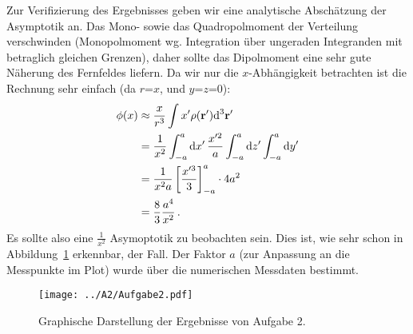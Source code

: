 Zur Verifizierung des Ergebnisses geben wir eine analytische Abschätzung der Asymptotik an. Das
Mono- sowie das Quadropolmoment der Verteilung verschwinden (Monopolmoment wg. Integration über ungeraden Integranden mit betraglich gleichen Grenzen), daher sollte das Dipolmoment eine sehr
gute Näherung des Fernfeldes liefern. Da wir nur die $x$-Abhängigkeit betrachten ist die Rechnung
sehr einfach (da $r$=$x$, und $y$=$z$=0):
\begin{equation}
	\begin{split}
		\phi (x) &\approx \frac{x}{r^3}\int x' \rho(\textbf{r}')\textup{d}^3\textbf{r}' \\
		&=\frac{1}{x^2} \int_{-a}^{a} \textup{d}x'\, \frac{x'^2}{a} \int_{-a}^{a} \textup{d}z' \int_{-a}^{a} \textup{d}y' \\
		&= \frac{1}{x^2 a} \left[ \frac{x'^3}{3} \right]_{-a}^a \cdot 4a^2 \\
		&= \frac{8}{3}\frac{a^4}{x^2}\,. \\
 	\end{split}
	\label{eqn:dipol}
\end{equation}
Es sollte also eine $\frac{1}{x^2}$ Asymoptotik zu beobachten sein. Dies ist, wie sehr schon in
Abbildung~\ref{fig:a2} erkennbar, der Fall. Der Faktor $a$ (zur Anpassung an die Messpunkte im Plot) wurde über die numerischen Messdaten bestimmt.
\begin{landscape}
	\begin{figure}
		\texttt{[image: ../A2/Aufgabe2.pdf]}
		\caption{Graphische Darstellung der Ergebnisse von Aufgabe 2.}
		\label{fig:a2}
	\end{figure}
\end{landscape}
\printbibliography

